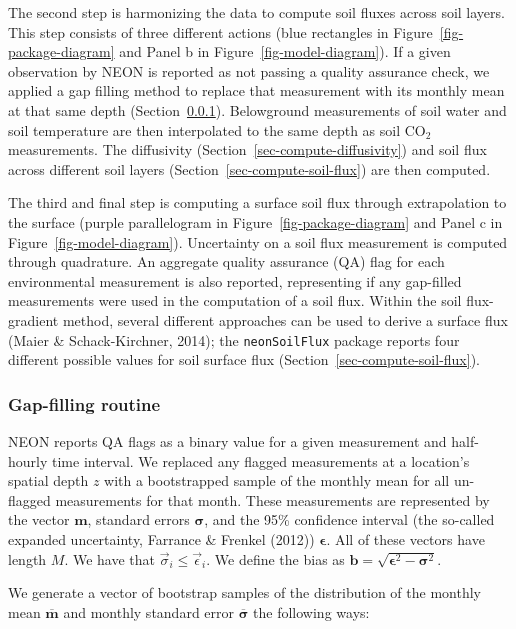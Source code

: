 \documentclass[
  letterpaper,
  DIV=11,
  numbers=noendperiod]{scrartcl}
\begin{document}
The second step is harmonizing the data to compute soil fluxes across
soil layers. This step consists of three different actions (blue
rectangles in Figure~\ref{fig-package-diagram} and Panel b in
Figure~\ref{fig-model-diagram}). If a given observation by NEON is
reported as not passing a quality assurance check, we applied a gap
filling method to replace that measurement with its monthly mean at that
same depth (Section~\ref{sec-gapfilling}). Belowground measurements of
soil water and soil temperature are then interpolated to the same depth
as soil CO\(_{2}\) measurements. The diffusivity
(Section~\ref{sec-compute-diffusivity}) and soil flux across different
soil layers (Section~\ref{sec-compute-soil-flux}) are then computed.

The third and final step is computing a surface soil flux through
extrapolation to the surface (purple parallelogram in
Figure~\ref{fig-package-diagram} and Panel c in
Figure~\ref{fig-model-diagram}). Uncertainty on a soil flux measurement
is computed through quadrature. An aggregate quality assurance (QA) flag
for each environmental measurement is also reported, representing if any
gap-filled measurements were used in the computation of a soil flux.
Within the soil flux-gradient method, several different approaches can
be used to derive a surface flux (Maier \& Schack-Kirchner, 2014); the
\texttt{neonSoilFlux} package reports four different possible values for
soil surface flux (Section~\ref{sec-compute-soil-flux}).

\subsubsection{Gap-filling routine}\label{sec-gapfilling}

NEON reports QA flags as a binary value for a given measurement and
half-hourly time interval. We replaced any flagged measurements at a
location's spatial depth \(z\) with a bootstrapped sample of the monthly
mean for all un-flagged measurements for that month. These measurements
are represented by the vector \(\mathbf{m}\), standard errors
\(\boldsymbol\sigma\), and the 95\% confidence interval (the so-called
expanded uncertainty, Farrance \& Frenkel (2012))
\(\boldsymbol\epsilon\). All of these vectors have length \(M\). We have
that \(\vec{\sigma}_{i}\leq\vec{\epsilon}_{i}\). We define the bias as
\(\mathbf{b}=\sqrt{\boldsymbol\epsilon^{2}-\boldsymbol\sigma^{2}}\).

We generate a vector of bootstrap samples of the distribution of the
monthly mean \(\overline{\boldsymbol{m}}\) and monthly standard error
\(\overline{\boldsymbol\sigma}\) the following ways:
\end{document}
